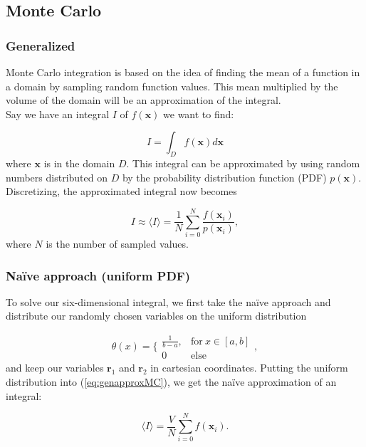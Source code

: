 \documentclass[../main.tex]{subfiles}
\begin{document}
\subsection{Monte Carlo}
\subsubsection{Generalized}
\label{sec:MC}
Monte Carlo integration is based on the idea of finding the mean of a function in a domain by sampling random function values. This mean multiplied by the volume of the domain will be an approximation of the integral. \\

Say we have an integral $I$ of $f(\mathbf x)$ we want to find:

\begin{equation*}
  I=\int_D f(\mathbf x)d\mathbf x
\end{equation*}
where $\mathbf{x}$ is in the domain $D$. This integral can be approximated by using random numbers distributed on $D$ by the probability distribution function (PDF) $p(\mathbf x)$. Discretizing, the approximated integral now becomes

\begin{equation}
  I \approx \langle I \rangle = \frac{1}{N}\sum_{i=0}^N\frac{f(\mathbf x_i)}{p(\mathbf x_i)},
  \label{eq:genapproxMC}
\end{equation}
where  $N$ is the number of sampled values.

\subsubsection{Naïve approach (uniform PDF)} \label{sec:naiveMC}
To solve our six-dimensional integral, we first take the naïve approach and distribute our randomly chosen variables on the uniform distribution

\begin{equation*}
  \theta (x) = \bigg\{ \begin{matrix}\frac{1}{b-a}, & \text{for}\ x\in[a,b] \\ 0 & \text{else}\end{matrix},
\end{equation*}
and keep our variables $\mathbf r_1$ and $\mathbf r_2$ in cartesian coordinates. Putting the uniform distribution into (\ref{eq:genapproxMC}), we get the naïve approximation of an integral:

\begin{equation}
  \langle I\rangle = \frac{V}{N}\sum_{i=0}^Nf(\mathbf x_i).
\end{equation}
\end{document}
